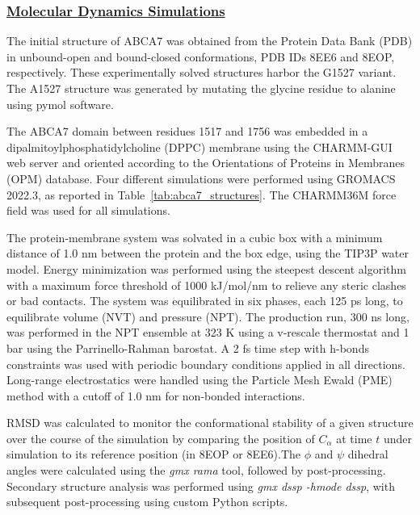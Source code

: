 \subsubsection{\underline{Molecular Dynamics Simulations}}
The initial structure of ABCA7 was obtained from the Protein Data Bank (PDB) in unbound-open and bound-closed conformations, PDB IDs 8EE6 and 8EOP, respectively. These experimentally solved structures harbor the G1527 variant. The A1527 structure was generated by mutating the glycine residue to alanine using pymol software. 
 
The ABCA7 domain between residues 1517 and 1756 was embedded in a dipalmitoylphosphatidylcholine (DPPC) membrane using the CHARMM-GUI web server and oriented according to the Orientations of Proteins in Membranes (OPM) database. Four different simulations were performed using GROMACS 2022.3, as reported in Table~\ref{tab:abca7_structures}. The CHARMM36M force field was used for all simulations.  
 
The protein-membrane system was solvated in a cubic box with a minimum distance of 1.0 nm between the protein and the box edge, using the TIP3P water model. Energy minimization was performed using the steepest descent algorithm with a maximum force threshold of 1000 kJ/mol/nm to relieve any steric clashes or bad contacts. The system was equilibrated in six phases, each 125 ps long, to equilibrate volume (NVT) and pressure (NPT). The production run, 300 ns long, was performed in the NPT ensemble at 323 K using a v-rescale thermostat and 1 bar using the Parrinello-Rahman barostat. A 2 fs time step with h-bonds constraints was used with periodic boundary conditions applied in all directions. Long-range electrostatics were handled using the Particle Mesh Ewald (PME) method with a cutoff of 1.0 nm for non-bonded interactions. 
 
RMSD was calculated to monitor the conformational stability of a given structure over the course of the simulation by comparing the position of $C_\alpha$ at time $t$ under simulation to its reference position (in 8EOP or 8EE6).The $\phi$ and $\psi$ dihedral angles were calculated using the \textit{gmx rama} tool, followed by post-processing. Secondary structure analysis was performed using \textit{gmx dssp -hmode dssp}, with subsequent post-processing using custom Python scripts.
 
